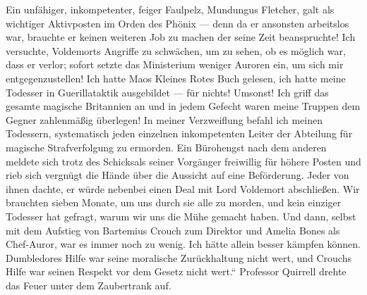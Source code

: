 Ein unfähiger, inkompetenter, feiger Faulpelz, Mundungus Fletcher, galt als wichtiger Aktivposten im Orden des Phönix — denn da er ansonsten arbeitslos war, brauchte er keinen weiteren Job zu machen der seine Zeit beanspruchte! Ich versuchte, Voldemorts Angriffe zu schwächen, um zu sehen, ob es möglich war, dass er verlor; sofort setzte das Ministerium weniger Auroren ein, um sich mir entgegenzustellen! Ich hatte Maos Kleines Rotes Buch gelesen, ich hatte meine Todesser in Guerillataktik ausgebildet — für nichts! Umsonst! Ich griff das gesamte magische Britannien an und in jedem Gefecht waren meine Truppen dem Gegner zahlenmäßig überlegen! In meiner Verzweiflung befahl ich meinen Todessern, systematisch jeden einzelnen inkompetenten Leiter der Abteilung für magische Strafverfolgung zu ermorden. Ein Bürohengst nach dem anderen meldete sich trotz des Schicksals seiner Vorgänger freiwillig für höhere Posten und rieb sich vergnügt die Hände über die Aussicht auf eine Beförderung. Jeder von ihnen dachte, er würde nebenbei einen Deal mit Lord Voldemort abschließen. Wir brauchten sieben Monate, um uns durch sie alle zu morden, und kein einziger Todesser hat gefragt, warum wir uns die Mühe gemacht haben. Und dann, selbst mit dem Aufstieg von Bartemius Crouch zum Direktor und Amelia Bones als Chef-Auror, war es immer noch zu wenig. Ich hätte allein besser kämpfen können. Dumbledores Hilfe war seine moralische Zurückhaltung nicht wert, und Crouchs Hilfe war seinen Respekt vor dem Gesetz nicht wert.“
Professor Quirrell drehte das Feuer unter dem Zaubertrank auf.

